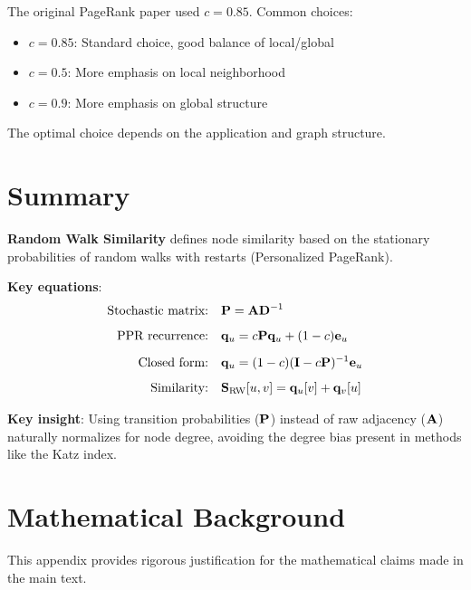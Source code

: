 \begin{notechapter}
The original PageRank paper used $c = 0.85$. Common choices:
\begin{itemize}
    \item $c = 0.85$: Standard choice, good balance of local/global
    \item $c = 0.5$: More emphasis on local neighborhood
    \item $c = 0.9$: More emphasis on global structure
\end{itemize}

The optimal choice depends on the application and graph structure.

\section{Summary}

\begin{keyidea}
\textbf{Random Walk Similarity} defines node similarity based on the stationary probabilities of random walks with restarts (Personalized PageRank).

\textbf{Key equations}:
\begin{align}
\text{Stochastic matrix:} \quad & \mathbf{P} = \mathbf{A} \mathbf{D}^{-1} \\[0.5em]
\text{PPR recurrence:} \quad & \mathbf{q}_u = c \mathbf{P} \mathbf{q}_u + (1 - c) \mathbf{e}_u \\[0.5em]
\text{Closed form:} \quad & \mathbf{q}_u = (1 - c)(\mathbf{I} - c\mathbf{P})^{-1} \mathbf{e}_u \\[0.5em]
\text{Similarity:} \quad & \mathbf{S}_{\text{RW}}[u, v] = \mathbf{q}_u[v] + \mathbf{q}_v[u]
\end{align}

\textbf{Key insight}: Using transition probabilities ($\mathbf{P}$) instead of raw adjacency ($\mathbf{A}$) naturally normalizes for node degree, avoiding the degree bias present in methods like the Katz index.
\end{keyidea}

\chapterappendix
\section{Mathematical Background}

This appendix provides rigorous justification for the mathematical claims made in the main text.


\end{notechapter}
